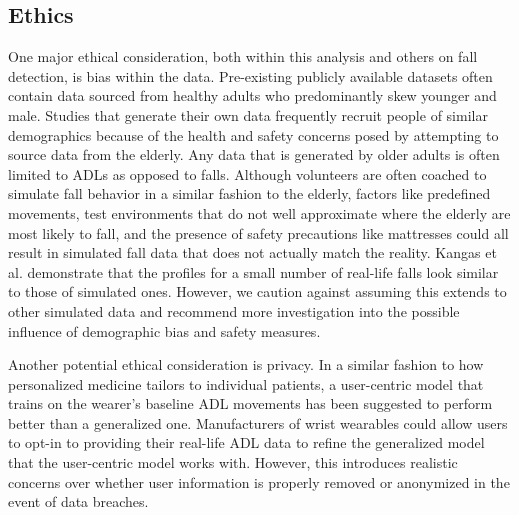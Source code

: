\documentclass{llncs}
\begin{document}





\subsection{Ethics}

One major ethical consideration, both within this analysis and others on fall detection, is bias within the data. Pre-existing publicly available datasets often contain data sourced from healthy adults who predominantly skew younger and male.\cite{casilari2017analysis} Studies that generate their own data frequently recruit people of similar demographics because of the health and safety concerns posed by attempting to source data from the elderly.\cite{gjoreski2016accurately} Any data that is generated by older adults is often limited to ADLs as opposed to falls. Although volunteers are often coached to simulate fall behavior in a similar fashion to the elderly, factors like predefined movements, test environments that do not well approximate where the elderly are most likely to fall, and the presence of safety precautions like mattresses could all result in simulated fall data that does not actually match the reality.\cite{casilari2017analysis} Kangas et al. demonstrate that the profiles for a small number of real-life falls look similar to those of simulated ones.\cite{kangas2008comparison} However, we caution against assuming this extends to other simulated data and recommend more investigation into the possible influence of demographic bias and safety measures.
	
	Another potential ethical consideration is privacy. In a similar fashion to how personalized medicine tailors to individual patients, a user-centric model that trains on the wearer's baseline ADL movements has been suggested to perform better than a generalized one.\cite{villar2019online} Manufacturers of wrist wearables could allow users to opt-in to providing their real-life ADL data to refine the generalized model that the user-centric model works with. However, this introduces realistic concerns over whether user information is properly removed or anonymized in the event of data breaches.
\end{document}
